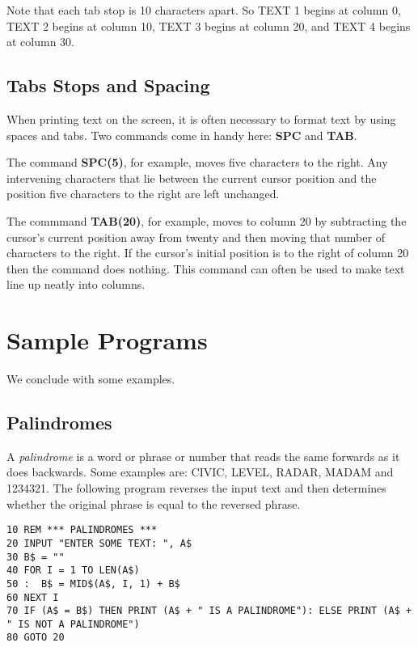 Note that each tab stop is 10 characters apart. So TEXT 1 begins at column 0, TEXT 2 begins at column 10, TEXT 3 begins at column 20, and TEXT 4 begins at column 30.

\subsection{Tabs Stops and Spacing}
When printing text on the screen, it is often necessary to format text by using spaces and tabs. Two commands come in handy here: {\bf SPC} and {\bf TAB}.

The command {\bf SPC(5)}, for example, moves five characters to the right. Any intervening characters that lie between the current cursor position and the position five characters to the right are left unchanged.

The commmand {\bf TAB(20)}, for example, moves to column 20 by subtracting the cursor's current position away from twenty and then moving that number of characters to the right. If the cursor's initial position is to the right of column 20 then the command does nothing. This command can often be used to make text line up neatly into columns.

\section{Sample Programs}

We conclude with some examples.

\subsection{Palindromes}

A {\it palindrome} is a word or phrase or number that reads the same forwards as it does backwards. Some examples are: CIVIC, LEVEL, RADAR, MADAM and 1234321. The following program reverses the input text and then determines whether the original phrase is equal to the reversed phrase.

\begin{tcolorbox}[colback=black,coltext=white]
\verbatimfont{\codefont}
\begin{verbatim}
10 REM *** PALINDROMES ***
20 INPUT "ENTER SOME TEXT: ", A$
30 B$ = ""
40 FOR I = 1 TO LEN(A$)
50 :  B$ = MID$(A$, I, 1) + B$
60 NEXT I
70 IF (A$ = B$) THEN PRINT (A$ + " IS A PALINDROME"): ELSE PRINT (A$ + " IS NOT A PALINDROME")
80 GOTO 20
\end{verbatim}
\end{tcolorbox}


